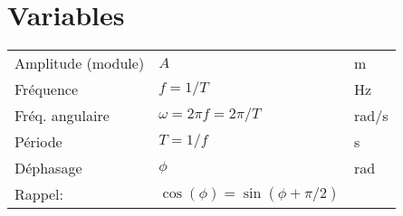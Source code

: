 \section{Variables}
\vspace{-2em}
\begin{tabular}{lll}
    Amplitude (module) & $A$ & m\\
    Fréquence & $f = 1/T$ & Hz\\
    Fréq. angulaire & $\omega = 2\pi f = 2\pi/T$ & rad/s\\
    Période & $T=1/f$ & s\\
    Déphasage & $\phi$ & rad\\
    \hfill Rappel: & $\cos(\phi)=\sin(\phi + \pi/2)$ & 
\end{tabular}